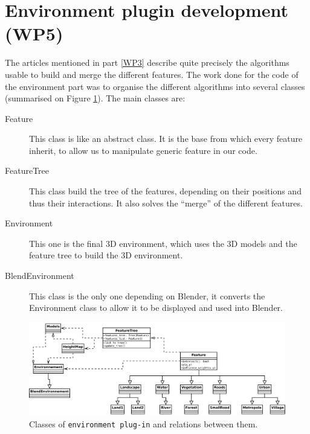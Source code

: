 \section{Environment plugin development (WP5)}

The articles mentioned in part \ref{WP3} describe quite precisely the algorithms usable to build and merge the different features. The work done for the code of the environment part was to organise the different algorithms into several classes (summarised on Figure \ref{env_classes}). The main classes are:

\begin{description}
  \item[Feature] This class is like an abstract class. It is the base from which every feature inherit, to allow us to manipulate generic feature in our code.
    \item[FeatureTree] This class build the tree of the features, depending on their positions and thus their interactions. It also solves the ``merge'' of the different features.
    \item[Environment] This one is the final 3D environment, which uses the 3D models and the feature tree to build the 3D environment.
    \item[BlendEnvironment] This class is the only one depending on Blender, it converts the Environment class to allow it to be displayed and used into Blender.
\end{description}

\begin{figure}[h]
  \includegraphics[width=15cm]{env_final.pdf}
  \caption{Classes of \texttt{environment plug-in} and relations between them.}
  \label{env_classes}
\end{figure}

